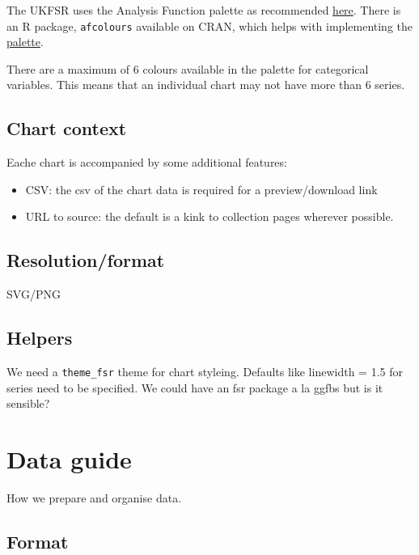 \documentclass[
]{book}
\providecommand{\tightlist}{%
  \setlength{\itemsep}{0pt}\setlength{\parskip}{0pt}}
\begin{document}
The UKFSR uses the Analysis Function palette as recommended \href{https://analysisfunction.civilservice.gov.uk/policy-store/data-visualisation-colours-in-charts/}{here}. There is an R package, \texttt{afcolours} available on CRAN, which helps with implementing the \href{https://best-practice-and-impact.github.io/afcolours/}{palette}.

There are a maximum of 6 colours available in the palette for categorical
variables. This means that an individual chart may not have more than 6 series.

\hypertarget{chart-context}{%
\section{Chart context}\label{chart-context}}

Eache chart is accompanied by some additional features:

\begin{itemize}
\tightlist
\item
  CSV: the csv of the chart data is required for a preview/download link
\item
  URL to source: the default is a kink to collection pages wherever possible.
\end{itemize}

\hypertarget{resolutionformat}{%
\section{Resolution/format}\label{resolutionformat}}

SVG/PNG

\hypertarget{helpers}{%
\section{Helpers}\label{helpers}}

We need a \texttt{theme\_fsr} theme for chart styleing. Defaults like linewidth = 1.5
for series need to be specified. We could have an fsr package a la ggfbs but is
it sensible?

\hypertarget{data}{%
\chapter{Data guide}\label{data}}

How we prepare and organise data.

\hypertarget{format}{%
\section{Format}\label{format}}
\end{document}
